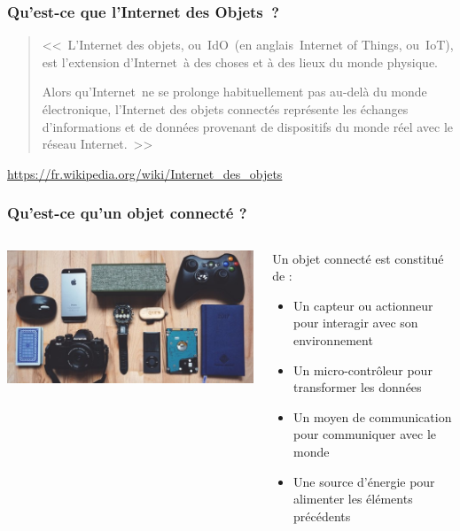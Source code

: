 \documentclass[aspectratio=169,utf8,french]{beamer}
\begin{document}
\begin{frame}
  \frametitle{Qu’est-ce que l’Internet des Objets~?}
  \begin{quotation}
    <<~L'Internet des objets, ou IdO (en anglais Internet of Things, ou IoT), est l'extension d'Internet à des choses et à des lieux du monde physique.
      
    Alors qu'Internet ne se prolonge habituellement pas au-delà du monde électronique, l'Internet des objets connectés représente les échanges d'informations et de données provenant de dispositifs du monde réel avec le réseau Internet.~>>
  \end{quotation}

  \hfill{\scriptsize\url{https://fr.wikipedia.org/wiki/Internet_des_objets}}
\end{frame}

\begin{frame}
  \frametitle{Qu'est-ce qu'un objet connecté ?}
  \begin{columns}
    \begin{column}{.4\textwidth}
      \includegraphics[width=\textwidth]{pictures/objetsconnectes.jpg}
    \end{column}
    \begin{column}{.6\textwidth}
      Un objet connecté est constitué de :
      \begin{itemize}
        \item Un capteur ou actionneur pour interagir avec son environnement
        \item Un micro-contrôleur pour transformer les données
        \item Un moyen de communication pour communiquer avec le monde
        \item Une source d’énergie pour alimenter les éléments précédents
      \end{itemize}
    \end{column}
  \end{columns}
\end{frame}
\end{document}
